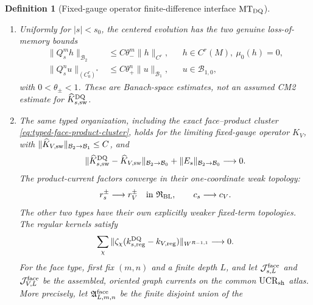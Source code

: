 \documentclass[11pt]{article}
\newtheorem{definition}[theorem]{Definition}
\newcommand{\cB}{\mathcal B}
\begin{document}
\begin{definition}[Fixed-gauge operator finite-difference interface
$\mathrm{MT}_{\rm DQ}$]
\begin{enumerate}[label=\textup{(MT\arabic*)}]
      positive face ledger is summed.
      A graph-supported boundary contribution of the commutator is included
      in $J_{s,\rm face}^{\rm DQ}$; it is never called an $M\times M$
      density.
\item Uniformly for $|s|<s_0$, the centered evolution has the two genuine
      loss-of-memory bounds
      \begin{align}
       \|Q_s^mh\|_{\cB_2}
       &\le C\theta_-^m\|h\|_{C^r},
       &&h\in C^r(M),\ \mu_0(h)=0,
       \label{eq:strong-side-memory}\\
       \|Q_s^nu\|_{(C^r_0)^*}
       &\le C\theta_+^n\|u\|_{\cB_1},
       &&u\in\cB_{1,0},
       \label{eq:response-side-memory}
      \end{align}
      with $0<\theta_\pm<1$.  These are Banach-space estimates, not an
      assumed CM2 estimate for $\widehat K_{s,\rm sw}^{\rm DQ}$.
\item The same typed organization, including the exact face--product cluster
      \eqref{eq:typed-face-product-cluster}, holds for the limiting
      fixed-gauge operator $K_V$, with
      $\|\widehat K_{V,\rm sw}\|_{\cB_2\to\cB_1}\le C$, and
      \begin{equation}
      \label{eq:strong-DQ-convergence}
       \|\widehat K_{s,\rm sw}^{\rm DQ}-\widehat K_{V,\rm sw}\|_{\cB_2\to\cB_0}
       +\|E_s\|_{\cB_2\to\cB_0}\longrightarrow0.
      \end{equation}
      The product-current factors converge in their one-coordinate weak
      topology:
      \begin{equation}
      \label{eq:product-current-DQ-convergence}
       r_{s}^{\pm}\longrightarrow r_V^{\pm}
       \quad\hbox{in }\mathfrak R_{\rm BL},
       \qquad c_s\longrightarrow c_V.
      \end{equation}
      The other two types have their own explicitly weaker fixed-term
      topologies.  The regular kernels satisfy
      \begin{equation}
      \label{eq:regular-DQ-weak-convergence}
       \sum_\chi\|\zeta_\chi
       (k_{s,\rm reg}^{\rm DQ}-k_{V,\rm reg})\|_{W^{R-1,1}}
       \longrightarrow0.
      \end{equation}
      For the face type, first fix $(m,n)$ and a finite depth $L$, and let
      $\mathcal J_{s,L}^{\rm face}$ and $\mathcal J_{V,L}^{\rm face}$ be the
      assembled, oriented graph currents on the common
      $\mathrm{UCR}_{\rm sh}$ atlas.  More precisely, let
      $\mathfrak A_{L,m,n}^{\rm face}$ be the finite disjoint union of the

\end{enumerate}
\end{definition}
\end{document}
